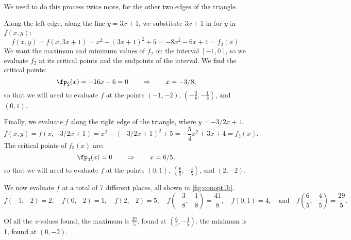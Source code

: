 {We need to do this process twice more, for the other two edges of the triangle.

Along the left edge, along the line $y=3x+1$, we substitute $3x+1$ in for $y$ in $f(x,y)$:
$$f(x,y) = f(x,3x+1) = x^2-(3x+1)^2+5 = -8x^2-6x+4 = f_2(x).$$
We want the maximum and minimum values of $f_2$ on the interval $[-1,0]$, so we evaluate $f_2$ at its critical points and the endpoints of the interval. We find the critical points:
\[\fp_2(x) = -16x-6=0 \qquad \Rightarrow \qquad x=-3/8,\]
so that we will need to evaluate $f$ at the points $(-1,-2)$, $(-\frac38,-\frac18)$, and $(0,1)$.


Finally, we evaluate $f$ along the right edge of the triangle, where $y = -3/2x+1$. 
$$f(x,y) = f(x,-3/2x+1) = x^2-(-3/2x+1)^2+5 = -\frac54x^2+3x+4=f_3(x).$$
The critical points of $f_3(x)$ are:
\[\fp_3(x) = 0 \qquad \Rightarrow \qquad x=6/5,\]%
so that we will need to evaluate $f$ at the points $(0,1)$, $(\frac65,-\frac45)$, and $(2,-2)$.


We now evaluate $f$ at a total of 7 different places, all shown in \autoref{fig:conopt1b}.
\[
 f(-1,-2)=2,\quad f(0,-2)=1,\quad f(2,-2)=5,\quad f(-\frac38,-\frac18)=\frac{41}8,\quad f(0,1)=4,\quad\text{and}\quad f(\frac65,-\frac45)=\frac{29}5.
\]

Of all the $z$-values found, the maximum is $\frac{29}5$, found at $(\frac65,-\frac45)$; the minimum is 1, found at $(0,-2)$.}

